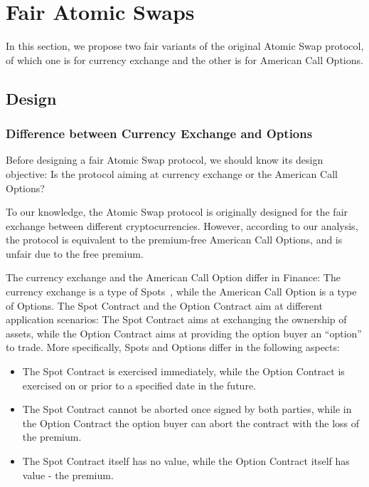 \section{Fair Atomic Swaps}
\label{sec:fair_atomic_swap}

In this section, we propose two fair variants of the original Atomic Swap protocol, of which one is for currency exchange and the other is for American Call Options.



\subsection{Design}

\subsubsection{Difference between Currency Exchange and Options}
\label{subsubsec:diff_spot_option}

Before designing a fair Atomic Swap protocol, we should know its design objective:
Is the protocol aiming at currency exchange or the American Call Options?

To our knowledge, the Atomic Swap protocol is originally designed for the fair exchange between different cryptocurrencies.
However, according to our analysis, the protocol is equivalent to the premium-free American Call Options, and is unfair due to the free premium.

The currency exchange and the American Call Option differ in Finance: The currency exchange is a type of Spots~\cite{hull1991introduction}, while the American Call Option is a type of Options.
The Spot Contract and the Option Contract aim at different application scenarios: The Spot Contract aims at exchanging the ownership of assets, while the Option Contract aims at providing the option buyer an ``option'' to trade.
More specifically, Spots and Options differ in the following aspects:

\begin{itemize}
    \item The Spot Contract is exercised immediately, while the Option Contract is exercised on or prior to a specified date in the future.
    \item The Spot Contract cannot be aborted once signed by both parties, while in the Option Contract the option buyer can abort the contract with the loss of the premium.
    \item The Spot Contract itself has no value, while the Option Contract itself has value - the premium.
\end{itemize}

